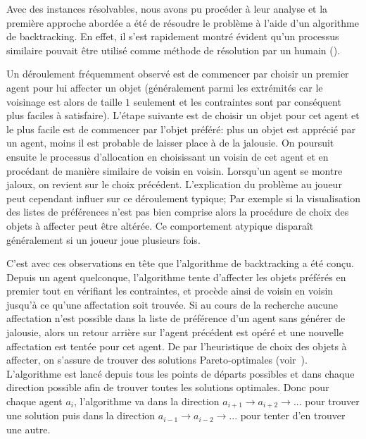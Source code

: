 \documentclass[../main.tex]{subfiles}
\begin{document}
	Avec des instances résolvables, nous avons pu procéder à leur analyse et la première approche abordée a été de résoudre le problème à l'aide d'un algorithme de backtracking. En effet, il s'est rapidement montré évident qu'un processus similaire pouvait être utilisé comme méthode de résolution par un humain (). 
	
	\begin{observation}
	\label{obs-backtrack}
	Un déroulement fréquemment observé est de commencer par choisir un premier agent pour lui affecter un objet (généralement parmi les extrémités car le voisinage est alors de taille $1$ seulement et les contraintes sont par conséquent plus faciles à satisfaire). L'étape suivante est de choisir un objet pour cet agent et le plus facile est de commencer par l'objet préféré: plus un objet est apprécié par un agent, moins il est probable de laisser place à de la jalousie. On poursuit ensuite le processus d'allocation en choisissant un voisin de cet agent et en procédant de manière similaire de voisin en voisin. Lorsqu'un agent se montre jaloux, on revient sur le choix précédent. L'explication du problème au joueur peut cependant influer sur ce déroulement typique; Par exemple si la visualisation des listes de préférences n'est pas bien comprise alors la procédure de choix des objets à affecter peut être altérée. Ce comportement atypique disparaît généralement si un joueur joue plusieurs fois.
	\end{observation}
	
	C'est avec ces observations en tête que l'algorithme de backtracking a été conçu. Depuis un agent quelconque, l'algorithme tente d'affecter les objets préférés en premier tout en vérifiant les contraintes, et procède ainsi de voisin en voisin jusqu'à ce qu'une affectation soit trouvée. Si au cours de la recherche aucune affectation n'est possible dans la liste de préférence d'un agent sans générer de jalousie, alors un retour arrière sur l'agent précédent est opéré et une nouvelle affectation est tentée pour cet agent. De par l'heuristique de choix des objets à affecter, on s'assure de trouver des solutions Pareto-optimales (voir~). L'algorithme est lancé depuis tous les points de départs possibles et dans chaque direction possible afin de trouver toutes les solutions optimales. Donc pour chaque agent $a_i$, l'algorithme va dans la direction $a_{i+1} \rightarrow a_{i+2} \rightarrow ...$ pour trouver une solution puis dans la direction $a_{i-1} \rightarrow a_{i-2} \rightarrow ...$ pour tenter d'en trouver une autre.
	
\end{document}
